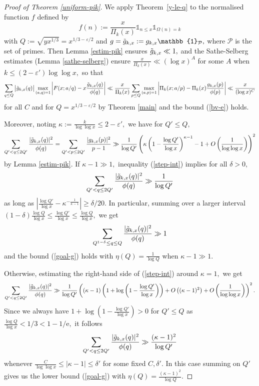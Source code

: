 \documentclass{article}
\newcommand{\e}{\mathrm{e}}
\newcommand{\Po}{\mathcal{P}}
\newcommand{\Ind}{\mathbb{1}}
\newcommand{\eps}{\varepsilon}
\begin{document}
\begin{proof}[Proof of Theorem \ref{uniform-pik}]
    We apply Theorem~\ref{y-le-q} to the normalised function $f$ defined by $$f(n) := \frac{x}{\Pi_k(x)} \Ind_{n\le x} \Ind_{\Omega(n) = k}$$ with $Q := \sqrt{yx^{1/3}} = x^{1/3-\eps/2}$ and $g = \Tilde{g}_{k,x} := g_{k,x} \Ind_{\Po},$ where $\Po$ is the set of primes. Then Lemma \ref{estim-pik} ensures $\Tilde{g}_{k,x} \ll 1,$ and the Sathe-Selberg estimates (Lemma \ref{sathe-selberg}) ensure $\frac{x}{\Pi_k(x)} \ll (\log x)^A$ for some $A$ when $k\le (2-\eps')\log\log x,$ so that $$\sum_{q\le Q} \big|\Tilde{g}_{k,x}(q)\big| \max_{(a,q) = 1} \left|F(x; a/q) - x\frac{\Tilde{g}_{k,x}(q)}{\phi(q)} \right| \ll \frac{x}{\Pi_k(x)} \sum_{p\le Q} \max_{(a,p) = 1} \left|\Pi_k(x; a/p) - \Pi_k(x)\frac{g_{k,x}(p)}{\phi(p)} \right| \ll \frac{x}{(\log x)^{C}}$$ for all $C$ and for $Q = x^{1/3-\eps/2}$ by Theorem \ref{main} and the bound (\ref{bv-e}) holds.

    Moreover, noting $\kappa := \frac{k}{\log\log x} \le 2-\eps',$ we have for $Q' \le Q,$
    \begin{equation}\label{step-int}
        \sum_{Q' < q \le 2Q'} \frac{|\Tilde{g}_{k,x}(q)|^2}{\phi(q)} = \sum_{Q' < p\le 2Q'} \frac{|g_{k,x}(p)|^2}{p-1} \gg \frac{1}{\log Q'} \left(\kappa\left(1 - \frac{\log Q'}{\log x}\right)^{\kappa-1} - 1 + O\left(\frac{1}{\log\log x}\right)\right)^2
    \end{equation}
    by Lemma \ref{estim-pik}. If $\kappa - 1 \gg 1,$ inequality (\ref{step-int}) implies for all $\delta > 0,$ $$\sum_{Q' < q \le 2Q'} \frac{|\Tilde{g}_{k,x}(q)|^2}{\phi(q)} \gg \frac{1}{\log Q'}$$ as long as $\left|\frac{\log Q'}{\log x} - \kappa^{-\frac{1}{\kappa-1}}\right| \ge \delta/20.$ In particular, summing over a larger interval $(1-\delta)\frac{\log Q}{\log x} \le \frac{\log Q'}{\log x} \le \frac{\log Q}{\log x},$ we get 
    $$\sum_{Q^{1-\delta} \le q \le Q} \frac{|\Tilde{g}_{k,x}(q)|^2}{\phi(q)} \gg 1$$ and the bound (\ref{goal-g}) holds with $\eta(Q) = \frac{1}{\log Q}$ when $\kappa-1 \gg 1.$

    Otherwise, estimating the right-hand side of (\ref{step-int}) around $\kappa=1,$ we get
    \begin{equation*}
        \sum_{Q' < q \le 2Q'} \frac{|\Tilde{g}_{k,x}(q)|^2}{\phi(q)} \gg \frac{1}{\log Q'} \left((\kappa-1)\left(1 + \log\left(1 - \frac{\log Q'}{\log x}\right)\right) + O\left((\kappa-1)^2\right) + O\left(\frac{1}{\log\log x}\right)\right)^2.
    \end{equation*}
    Since we always have $1+\log\left(1 - \frac{\log Q'}{\log x}\right) >0$ for $Q' \le Q$ as $\frac{\log Q}{\log x} < 1/3 < 1-1/\e,$ it follows $$\sum_{Q' < q \le 2Q'} \frac{|\Tilde{g}_{k,x}(q)|^2}{\phi(q)} \gg \frac{(\kappa-1)^2}{\log Q'}$$ whenever $\frac{C}{\log\log x} \le |\kappa-1| \le \delta'$ for some fixed $C, \delta'.$ In this case summing on $Q'$ gives us the lower bound (\ref{goal-g}) with $\eta(Q) = \frac{(\kappa-1)^2}{\log Q}.$


\end{proof}
\end{document}
